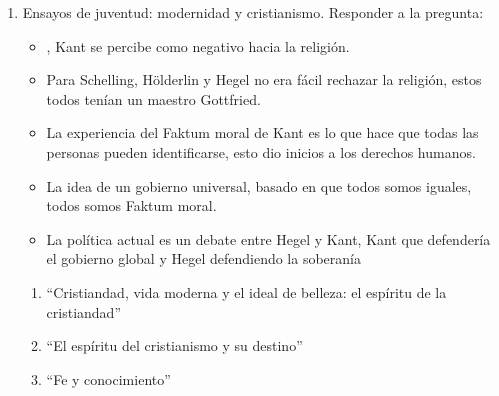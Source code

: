 \begin{enumerate}
    \item Ensayos de juventud: modernidad y cristianismo. Responder a la pregunta:  
        \begin{itemize}
            \item {}, Kant se percibe como negativo hacia la religión. 
            \item Para Schelling, Hölderlin y Hegel no era fácil rechazar la religión, estos todos tenían un maestro Gottfried. 
            \item La experiencia del Faktum moral de Kant es lo que hace que todas las personas pueden identificarse, esto dio inicios a los derechos humanos. 
            \item La idea de un gobierno universal, basado en que todos somos iguales, todos somos Faktum moral. 
            \item La política actual es un debate entre Hegel y Kant, Kant que defendería el gobierno global y Hegel defendiendo la soberanía  
        \end{itemize}
        \begin{enumerate}
            \item ``Cristiandad, vida moderna y el ideal de belleza: el espíritu de la cristiandad'' 
            \item ``El espíritu del cristianismo y su destino''
            \item ``Fe y conocimiento''
        \end{enumerate}
    

\end{enumerate}

